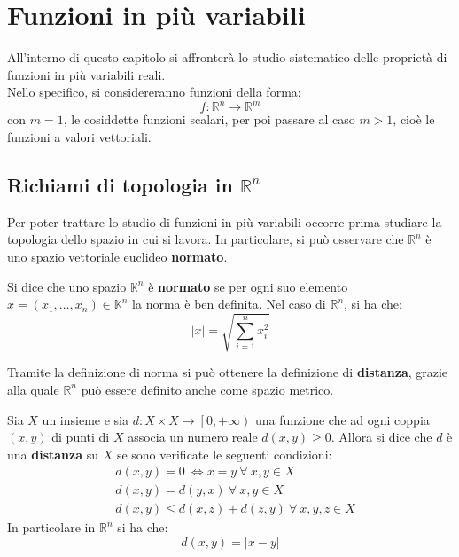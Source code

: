 \chapter{Funzioni in più variabili}
All'interno di questo capitolo si affronterà lo studio sistematico delle proprietà di funzioni in più variabili reali.\\
Nello specifico, si considereranno funzioni della forma: 
\begin{equation}
    f:\mathbb{R}^n \to \mathbb{R}^m
\end{equation}
con $m=1$, le cosiddette funzioni scalari, per poi passare al caso $m>1$, cioè le funzioni a valori vettoriali.
\section{Richiami di topologia in $\mathbb{R}^n$}
Per poter trattare lo studio di funzioni in più variabili occorre prima studiare la topologia dello spazio in cui si lavora.
In particolare, si può osservare che $\mathbb{R}^n$ è uno spazio vettoriale euclideo \textbf{normato}.
\begin{definition}
    Si dice che uno spazio $\mathbb{K}^n$ è \textbf{normato} se per ogni suo elemento $x=(x_1,\dots,x_n) \in \mathbb{K}^n$ la norma è ben definita. Nel caso di $\mathbb{R}^n$, si ha che:
    \begin{equation}
        |x|=\sqrt{\sum\limits_{i=1}^{n}{x_i^2}}
    \end{equation}
\end{definition}
Tramite la definizione di norma si può ottenere la definizione di \textbf{distanza}, grazie alla quale $\mathbb{R}^n$ può essere definito anche come spazio metrico.
\begin{definition}
    Sia $X$ un insieme e sia $d:X \times X \to \left[0, +\infty \right)$ una funzione che ad ogni coppia $(x,y)$ di punti di $X$ associa un numero reale $d(x,y)\geq0$. Allora si dice che $d$ è una \textbf{distanza} su $X$ se sono verificate le seguenti condizioni:
    \begin{align}
        &d(x,y)=0 \ \iff x=y \ \forall\ x,y \in X \\
        &d(x,y)=d(y,x) \ \forall\ x,y \in X \\
        &d(x,y) \leq d(x,z) + d(z, y) \ \forall\ x,y,z \in X
    \end{align}
    In particolare in $\mathbb{R}^n$ si ha che:
    \begin{equation}
        d(x, y)=|x-y|
    \end{equation}
\end{definition}
